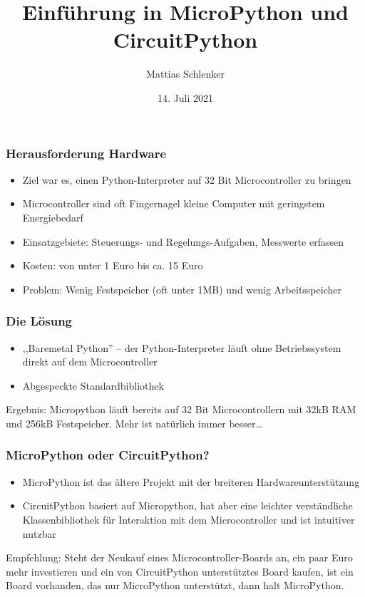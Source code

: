 \documentclass{beamer}
\title{Einführung in MicroPython und CircuitPython}
\author{Mattias Schlenker}
\institute{Wilhelm-Ostwald-Gymnasium}
\date{14. Juli 2021}
\begin{document}
\frame{\titlepage}

\begin{frame}
\frametitle{Herausforderung Hardware}
\begin{itemize}
\item Ziel war es, einen Python-Interpreter auf 32 Bit Microcontroller zu bringen
\item Microcontroller sind oft Fingernagel kleine Computer mit geringstem Energiebedarf
\item Einsatzgebiete: Steuerungs- und Regelungs-Aufgaben, Messwerte erfassen
\item Kosten: von unter 1 Euro bis ca. 15 Euro
\item Problem: Wenig Festspeicher (oft unter 1MB) und wenig Arbeitsspeicher 
\end{itemize}
\end{frame}

\begin{frame}
\frametitle{Die Lösung}

\begin{itemize}
\item ,,Baremetal Python'' – der Python-Interpreter läuft ohne Betriebssystem direkt auf dem Microcontroller
\item Abgespeckte Standardbibliothek
\end{itemize}

Ergebnis: Micropython läuft bereits auf 32 Bit Microcontrollern mit 32kB RAM und 256kB Festspeicher. Mehr ist natürlich immer besser…

\end{frame}


\begin{frame}
\frametitle{MicroPython oder CircuitPython?}

\begin{itemize}
\item MicroPython ist das ältere Projekt mit der breiteren Hardwareunterstützung
\item CircuitPython basiert auf Micropython, hat aber eine leichter verständliche Klassenbibliothek für Interaktion mit dem Microcontroller und ist intuitiver nutzbar
\end{itemize}

Empfehlung: Steht der Neukauf eines Microcontroller-Boards an, ein paar Euro mehr investieren und ein von CircuitPython unterstütztes Board kaufen, ist ein Board vorhanden, das nur MicroPython unterstützt, dann halt MicroPython.

\end{frame}
\end{document}

